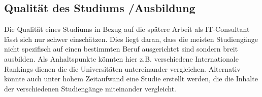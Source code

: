 \subsection{ Qualität des Studiums /Ausbildung}
Die Qualität eines Studiums in Bezug auf die spätere Arbeit als IT-Consultant lässt sich nur schwer einschätzen. Dies liegt daran, dass die meisten Studiengänge nicht spezifisch auf einen bestimmten Beruf ausgerichtet sind sondern breit ausbilden. 
Als Anhaltspunkte könnten hier z.B. verschiedene Internationale Rankings dienen die die Universitäten untereinander vergleichen.
Alternativ könnte auch unter hohem Zeitaufwand eine Studie erstellt werden, die die Inhalte der verschiedenen Studiengänge miteinander vergleicht.







